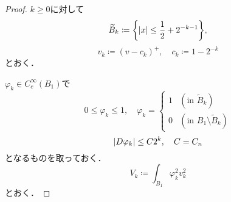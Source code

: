 \documentclass[a4paper]{ltjsarticle}
\newcommand{\1}{\mathbbm{1}}
\numberwithin{equation}{section}
\theoremstyle{definition}
\begin{document}
\begin{proof}
    $k\geq0$に対して
    \begin{equation}
        \widetilde{B}_k\coloneqq\qty{\abs{x}\leq \frac{1}{2}+2^{-k-1}},
    \end{equation}
    \begin{equation}
        v_{k}\coloneqq (v-c_k)^+,\quad c_k\coloneqq 1-2^{-k}
    \end{equation}
    とおく．

    $\varphi_k\in C_{c}^{\infty}(B_1)$で
    \begin{equation}
        0\leq \varphi_k\leq 1,\quad \varphi_k=\begin{cases}
            1 & (\text{in $\widetilde{B}_k$})\\
            0 & (\text{in $B_1\setminus\widetilde{B}_k$})
        \end{cases}
    \end{equation}
    \begin{equation}
        \abs{D\varphi_k}\leq C2^k,\quad C=C_n
    \end{equation}
    となるものを取っておく．
    \begin{equation}
        V_k\coloneqq \int_{B_1}\varphi_k^2 v_k^2
    \end{equation}
    とおく．


\end{proof}
\end{document}
